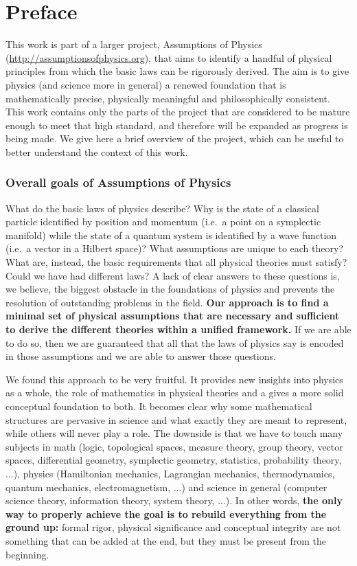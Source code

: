 \documentclass[11pt,letterpaper,fleqn]{memoir} %
\begin{document}
\chapter{Preface}

This work is part of a larger project, Assumptions of Physics (\url{http://assumptionsofphysics.org}), that aims to identify a handful of physical principles from which the basic laws can be rigorously derived. The aim is to give physics (and science more in general) a renewed foundation that is mathematically precise, physically meaningful and philosophically consistent. This work contains only the parts of the project that are considered to be mature enough to meet that high standard, and therefore will be expanded as progress is being made. We give here a brief overview of the project, which can be useful to better understand the context of this work.

\subsection{Overall goals of Assumptions of Physics}

What do the basic laws of physics describe? Why is the state of a classical particle identified by position and momentum (i.e.~a point on a symplectic manifold) while the state of a quantum system is identified by a wave function (i.e.~a vector in a Hilbert space)? What assumptions are unique to each theory? What are, instead, the basic requirements that all physical theories must satisfy? Could we have had different laws? A lack of clear answers to these questions is, we believe, the biggest obstacle in the foundations of physics and prevents the resolution of outstanding problems in the field. \textbf{Our approach is to find a minimal set of physical assumptions that are necessary and sufficient to derive the different theories within a unified framework.} If we are able to do so, then we are guaranteed that all that the laws of physics say is encoded in those assumptions and we are able to answer those questions.

We found this approach to be very fruitful. It provides new insights into physics as a whole, the role of mathematics in physical theories and a gives a more solid conceptual foundation to both. It becomes clear why some mathematical structures are pervasive in science and what exactly they are meant to represent, while others will never play a role. The downside is that we have to touch many subjects in math (logic, topological spaces, measure theory, group theory, vector spaces, differential geometry, symplectic geometry, statistics, probability theory, ...), physics (Hamiltonian mechanics, Lagrangian mechanics, thermodynamics, quantum mechanics, electromagnetism, ...) and science in general (computer science theory, information theory, system theory, ...). In other words, \textbf{the only way to properly achieve the goal is to rebuild everything from the ground up:} formal rigor, physical significance and conceptual integrity are not something that can be added at the end, but they must be present from the beginning.
\end{document}
